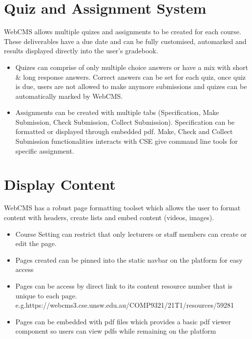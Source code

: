 \section{Quiz and Assignment System}
WebCMS allows multiple quizes and assignments to be created for each course. These deliverables have a due date and can be fully customised, automarked and results displayed directly into the user's gradebook.
\begin{itemize}
\item Quizes can comprise of only multiple choice answers or have a mix with short \& long response answers. Correct answers can be set for each quiz, once quiz is due, users are not allowed to make anymore submissions and quizes can be automatically marked by WebCMS.
\item Assignments can be created with multiple tabs (Specification, Make Submission, Check Submission, Collect Submission). Specification can be formatted or displayed through embedded pdf. Make, Check and Collect Submission functionalities interacts with CSE give command line tools for specific assignment.
\end{itemize}

\section{Display Content}
WebCMS has a robust page formatting toolset which allows the user to format content with headers, create lists and embed content (videos, images).
\begin{itemize}
\item Course Setting can restrict that only lecturers or staff members can create or edit the page.
\item Pages created can be pinned into the static navbar on the platform for easy access
\item Pages can be access by direct link to its content resource number that is unique to each page. e.g.https://webcms3.cse.unsw.edu.au/COMP9321/21T1/resources/59281
\item Pages can be embedded with pdf files which provides a basic pdf viewer component so users can view pdfs while remaining on the platform
\end{itemize}

